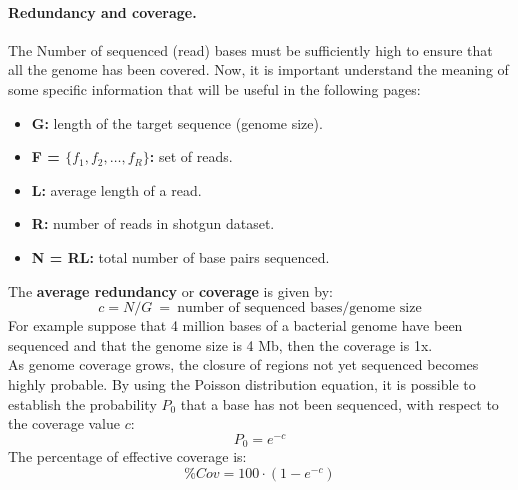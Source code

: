 \paragraph*{Redundancy and coverage.} The Number of sequenced (read) bases must be sufficiently high to ensure that all the genome has been covered. Now, it is important understand the meaning of some specific information that will be useful in the following pages:
\begin{itemize}
	\item \textbf{G:} length of the target sequence (genome size).
	\item \textbf{\textbf{F} = $\{f_1, f_2, \dots, f_R\}$:} set of reads.
	\item \textbf{L:} average length of a read.
	\item \textbf{R:} number of reads in shotgun dataset.
	\item \textbf{N = RL:} total number of base pairs sequenced.
\end{itemize}
The \textbf{average redundancy} or \textbf{coverage} is given by:
$$c = N/G ~ = ~ \text{number of sequenced bases}/\text{genome size}$$
For example suppose that 4 million bases of a bacterial genome have been sequenced and that the genome size is 4 Mb, then the coverage is 1x.\\
As genome coverage grows, the closure of regions not yet sequenced becomes highly probable. By using the Poisson distribution equation, it is possible to establish the probability $P_0$ that a base has not been sequenced, with respect to the coverage value $c$:
$$P_0 = e^{-c}$$
The percentage of effective coverage is:
$$\% Cov = 100 \cdot (1-e^{-c})$$
